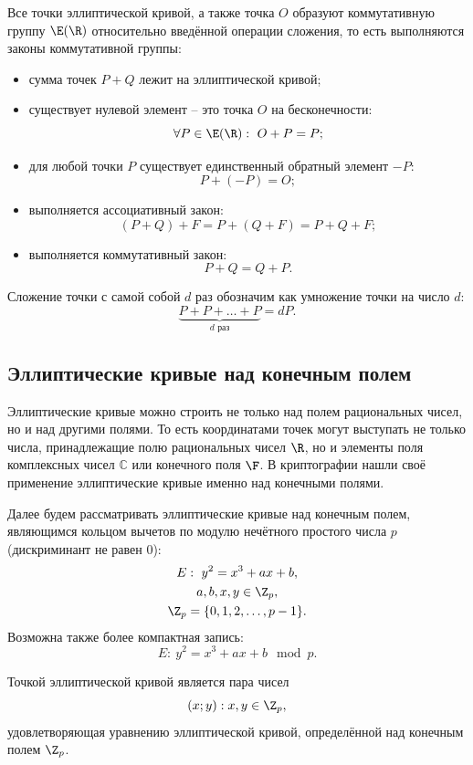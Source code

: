 Все точки эллиптической кривой, а также точка $O$ образуют коммутативную группу $\E(\R)$ относительно введённой операции сложения, то есть выполняются законы коммутативной группы:
\begin{itemize}
    \item сумма точек $P + Q$ лежит на эллиптической кривой;
    \item существует нулевой элемент -- это точка $O$ на бесконечности:
        \[ \forall P \in \E(\R): ~ O + P = P; \]
    \item для любой точки $P$ существует единственный обратный элемент $-P$:
        \[ P + (-P) = O; \]
    \item выполняется ассоциативный закон:
        \[ (P + Q) + F = P + (Q + F) = P + Q + F; \]
    \item выполняется коммутативный закон:
        \[ P + Q = Q + P. \]
\end{itemize}

Сложение точки с самой собой $d$ раз обозначим как умножение точки на число $d$:
    \[ \underbrace{P + P + \ldots + P}_{d \text{ раз}} = d P. \]


\subsection{Эллиптические кривые над конечным полем}

Эллиптические кривые можно строить не только над полем рациональных чисел, но и над другими полями. То есть координатами точек могут выступать не только числа, принадлежащие полю рациональных чисел $\R$, но и элементы поля комплексных чисел $\mathbb{C}$ или конечного поля $\F$. В криптографии нашли своё применение эллиптические кривые именно над конечными полями.

Далее будем рассматривать эллиптические кривые над конечным полем, являющимся кольцом вычетов по модулю нечётного простого числа $p$ (дискриминант не равен 0):
\begin{gather*}
    E: ~ y^2 = x^3 + a x + b, \\
    a, b, x, y \in \Z_p, \\
   \Z_p = \{0, 1, 2, \ldots, p-1\}.
\end{gather*}
Возможна также более компактная запись:
    \[ E: ~ y^2 = x^3 + a x + b \mod p.\]

Точкой эллиптической кривой является пара чисел
    \[ (x; y): x, y \in \Z_p, \]
удовлетворяющая уравнению эллиптической кривой, определённой над конечным полем $\Z_p$.

